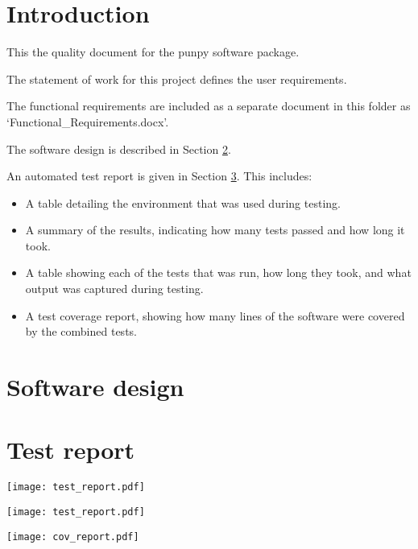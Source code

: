 \documentclass{article}
\begin{document}

\tableofcontents



\clearpage
\pagestyle{long}


\graphicspath{{images/}}
\graphicspath{{./}}

\section{Introduction}\label{introduction}

This the quality document for the punpy software package.


The statement of work for this project defines the user requirements.

The functional requirements are included as a separate document in this folder as `Functional\_Requirements.docx'.

The software design is described in Section \ref{design}.

An automated test report is given in Section \ref{testreport}. This includes:
\begin{itemize}
\item A table detailing the environment that was used during testing.
\item A summary of the results, indicating how many tests passed and how long it took.
\item A table showing each of the tests that was run, how long they took, and what output was captured during testing.
\item A test coverage report, showing how many lines of the software were covered by the combined tests.
\end{itemize}

\clearpage
\section{Software design}\label{design}



\clearpage
\section{Test report}\label{testreport}

\texttt{[image: test\_report.pdf]}

\texttt{[image: test\_report.pdf]}


\texttt{[image: cov\_report.pdf]}



\end{document}
